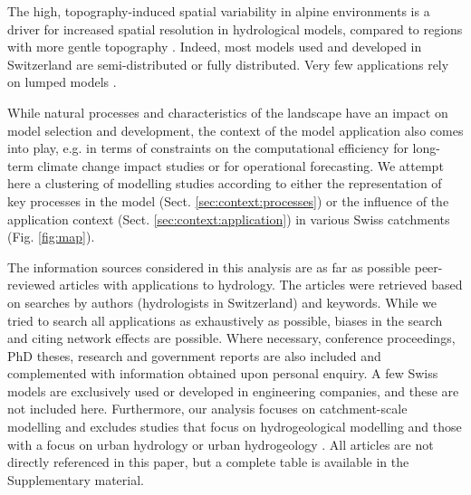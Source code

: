 \documentclass[10pt,a4paper]{article}
\begin{document}
The high, topography-induced spatial variability in alpine environments is a driver for increased spatial resolution in hydrological models, compared to regions with more gentle topography \citep{Gurtz2003}. Indeed, most models used and developed in Switzerland are semi-distributed or fully distributed. Very few applications rely on lumped models \citep[for example,][]{Keller2019a, MullerThomy2019}.

While natural processes and characteristics of the landscape have an impact on model selection and development, the context of the model application also comes into play, e.g. in terms of constraints on the computational efficiency for long-term climate change impact studies or for operational forecasting. We attempt here a clustering of modelling studies according to either the representation of key processes in the model (Sect. \ref{sec:context:processes}) or the influence of the application context (Sect. \ref{sec:context:application}) in various Swiss catchments (Fig. \ref{fig:map}).

The information sources considered in this analysis are as far as possible peer-reviewed articles with applications to hydrology. The articles were retrieved based on searches by authors (hydrologists in Switzerland) and keywords. While we tried to search all applications as exhaustively as possible, biases in the search and citing network effects are possible. Where necessary, conference proceedings, PhD theses, research and government reports are also included and complemented with information obtained upon personal enquiry. A few Swiss models are exclusively used or developed in engineering companies, and these are not included here. Furthermore, our analysis focuses on catchment-scale modelling and excludes studies that focus on hydrogeological modelling \citep{Carlier2019} and those with a focus on urban hydrology \citep{Peleg2017} or urban hydrogeology \citep{Schirmer2013}. All articles are not directly referenced in this paper, but a complete table is available in the Supplementary material.
\end{document}
